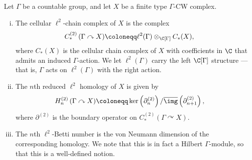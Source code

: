\documentclass[10pt]{mypackage}
\renewcommand{\coloneq}{\coloneqq}
\begin{document}
\begin{definition}
  Let $\Gamma$ be a countable group, and let $X$ be a finite type $\Gamma$-CW complex.
  \begin{enumerate}[(i)]
    \item The cellular $\ell^2$-chain complex of $X$ is the complex
      \begin{align*}
        C_{\ast}^{(2)}\left( \Gamma\curvearrowright X \right) &\coloneq \ell^2(\Gamma)\otimes_{\C[\Gamma]} C_{\ast}(X),
      \end{align*}
      where $C_{\ast}(X)$ is the cellular chain complex of $X$ with coefficients in $\C$ that admits an induced $\Gamma$-action. We let $\ell^2\left(\Gamma\right)$ carry the left $\C[\Gamma]$ structure --- that is, $\Gamma$ acts on $\ell^2(\Gamma)$ with the right action.
    \item The $n$th reduced $\ell^2$ homology of $X$ is given by
      \begin{align*}
        H_n^{(2)}\left( \Gamma\curvearrowright X \right) &\coloneq \ker\left( \partial_n^{(2)} \right)/ \overline{\img}\left( \partial_{n+1}^{(2)} \right),
      \end{align*}
      where $\partial^{(2)}$ is the boundary operator on $C_{\ast}^{(2)}\left( \Gamma\curvearrowright X \right)$.
    \item The $n$th $\ell^2$-Betti number is the von Neumann dimension of the corresponding homology. We note that this is in fact a Hilbert $\Gamma$-module, so that this is a well-defined notion.
  \end{enumerate}
\end{definition}
\nocite{luck_l2_homology,loh_l2_homology,kammeyer_l2_invariants}
\printbibliography
\end{document}
